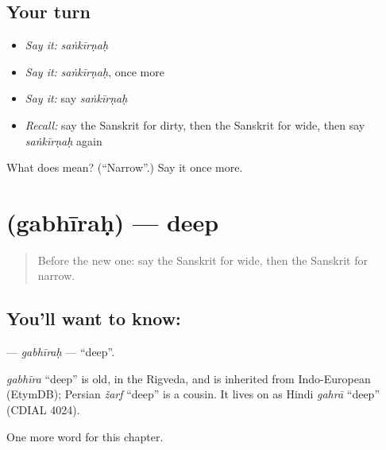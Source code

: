 \subsection*{Your turn}
\begin{itemize}
\raggedright
  \item \emph{Say it:} \emph{saṅkīrṇaḥ}
  \item \emph{Say it:} \emph{saṅkīrṇaḥ}, once more
  \item \emph{Say it:} say \emph{saṅkīrṇaḥ}
  \item \emph{Recall:} say the Sanskrit for dirty, then the Sanskrit for wide, then say \emph{saṅkīrṇaḥ} again
\end{itemize}

\begin{tcolorbox}[breakable,colback=teal!4,colframe=teal!35!black,title={Before you move on}]
What does  mean? (\textquotedblleft{}Narrow\textquotedblright{}.) Say it once more.
\end{tcolorbox}
\section[\texorpdfstring{\sk{गभीरः} (gabhīraḥ)}{गभीरः (gabhīraḥ)}]{ (gabhīraḥ) — deep}

\label{lesson:SA-C126-gabhirah}



\begin{quote}
Before the new one: say the Sanskrit for wide, then the Sanskrit for narrow.
\end{quote}

\subsection*{You'll want to know: }
\textbf{} — \emph{gabhīraḥ} — \textquotedblleft{}deep\textquotedblright{}.

\begin{cousinweb}
\emph{gabhīra} \textquotedblleft{}deep\textquotedblright{} is old, in the Rigveda, and is inherited from Indo-European (EtymDB); Persian \emph{žarf} \textquotedblleft{}deep\textquotedblright{} is a cousin. It lives on as Hindi \emph{gahrā} \textquotedblleft{}deep\textquotedblright{} (CDIAL 4024).
\end{cousinweb}

\begin{grammarlens}[title={What you've built}]
One more word for this chapter.
\end{grammarlens}


